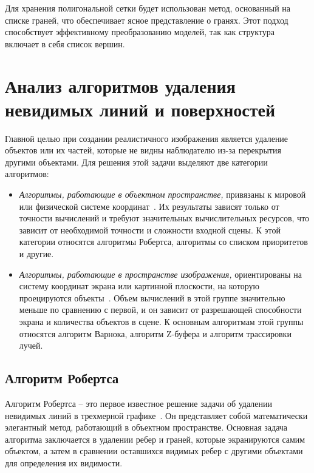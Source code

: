 Для хранения полигональной сетки будет использован метод, основанный на списке граней, что обеспечивает ясное представление о гранях. Этот подход способствует эффективному преобразованию моделей, так как структура включает в себя список вершин.

\clearpage

\section{Анализ алгоритмов удаления невидимых линий и поверхностей}

Главной целью при создании реалистичного изображения является удаление объектов или их частей, которые не видны наблюдателю из-за перекрытия другими объектами. Для решения этой задачи выделяют две категории алгоритмов:

\begin{itemize}[label=--]
	\item \textit{Алгоритмы, работающие в объектном пространстве,} привязаны к мировой или физической системе координат~\cite{lit3}. Их результаты зависят только от точности вычислений и требуют значительных вычислительных ресурсов, что зависит от необходимой точности и сложности входной сцены. К этой категории относятся алгоритмы Робертса, алгоритмы со списком приоритетов и другие.
	
	\item \textit{Алгоритмы, работающие в пространстве изображения,} ориентированы на систему координат экрана или картинной плоскости, на которую проецируются объекты~\cite{lit3}. Объем вычислений в этой группе значительно меньше по сравнению с первой, и он зависит от разрешающей способности экрана и количества объектов в сцене. К основным алгоритмам этой группы относятся алгоритм Варнока, алгоритм Z-буфера и алгоритм трассировки лучей.
\end{itemize}

\subsection{Алгоритм Робертса}

Алгоритм Робертса -- это первое известное решение задачи об удалении невидимых линий в трехмерной графике~\cite{lit3}. Он представляет собой математически элегантный метод, работающий в объектном пространстве. Основная задача алгоритма заключается в удалении ребер и граней, которые экранируются самим объектом, а затем в сравнении оставшихся видимых ребер с другими объектами для определения их видимости.

